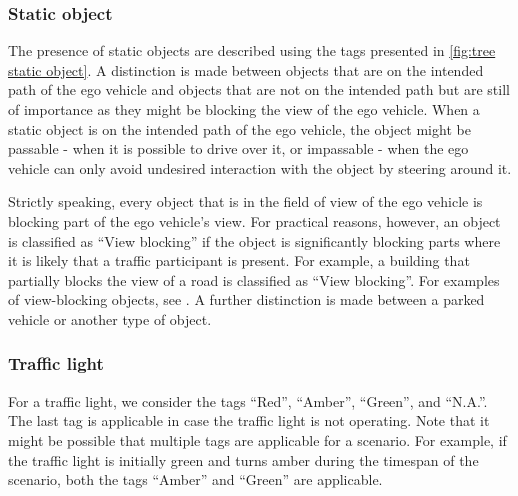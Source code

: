 \documentclass[twoside,twocolumn,9pt]{extarticle}
\theoremstyle{plain}
\begin{document}
\subsubsection{Static object}
\label{sec:static object}

The presence of static objects are described using the tags presented in \cref{fig:tree static object}. A distinction is made between objects that are on the intended path of the ego vehicle and objects that are not on the intended path but are still of importance as they might be blocking the view of the ego vehicle. When a static object is on the intended path of the ego vehicle, the object might be passable - when it is possible to drive over it, or impassable - when the ego vehicle can only avoid undesired interaction with the object by steering around it.

Strictly speaking, every object that is in the field of view of the ego vehicle is blocking part of the ego vehicle's view. For practical reasons, however, an object is classified as ``View blocking'' if the object is significantly blocking parts where it is likely that a traffic participant is present. For example, a building that partially blocks the view of a road is classified as ``View blocking''. For examples of view-blocking objects, see \cite{CATS2015}. A further distinction is made between a parked vehicle or another type of object.

%

\subsubsection{Traffic light}
\label{sec:traffic light}

For a traffic light, we consider the tags ``Red'', ``Amber'', ``Green'', and ``N.A.''. The last tag is applicable in case the traffic light is not operating.
Note that it might be possible that multiple tags are applicable for a scenario. For example, if the traffic light is initially green and turns amber during the timespan of the scenario, both the tags ``Amber'' and ``Green'' are applicable.
\end{document}
